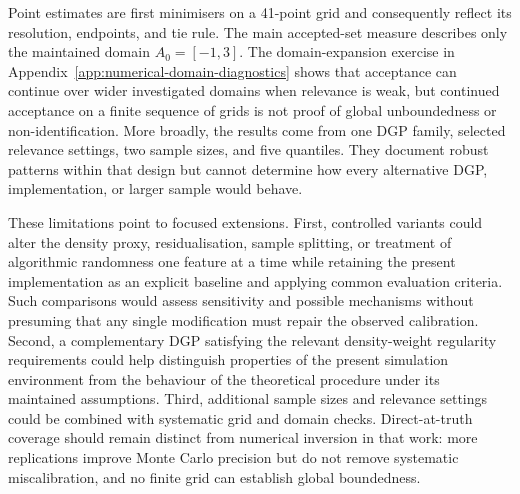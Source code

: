 Point estimates are first minimisers on a 41-point grid and consequently reflect its resolution, endpoints, and tie rule. The main accepted-set measure describes only the maintained domain $A_0=[-1,3]$. The domain-expansion exercise in Appendix~\ref{app:numerical-domain-diagnostics} shows that acceptance can continue over wider investigated domains when relevance is weak, but continued acceptance on a finite sequence of grids is not proof of global unboundedness or non-identification. More broadly, the results come from one DGP family, selected relevance settings, two sample sizes, and five quantiles. They document robust patterns within that design but cannot determine how every alternative DGP, implementation, or larger sample would behave.

These limitations point to focused extensions. First, controlled variants could alter the density proxy, residualisation, sample splitting, or treatment of algorithmic randomness one feature at a time while retaining the present implementation as an explicit baseline and applying common evaluation criteria. Such comparisons would assess sensitivity and possible mechanisms without presuming that any single modification must repair the observed calibration. Second, a complementary DGP satisfying the relevant density-weight regularity requirements could help distinguish properties of the present simulation environment from the behaviour of the theoretical procedure under its maintained assumptions. Third, additional sample sizes and relevance settings could be combined with systematic grid and domain checks. Direct-at-truth coverage should remain distinct from numerical inversion in that work: more replications improve Monte Carlo precision but do not remove systematic miscalibration, and no finite grid can establish global boundedness.
